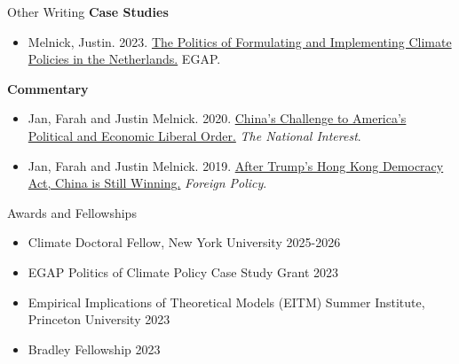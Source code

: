 \documentclass{resume} %
\begin{document}
\newpage
\begin{rSection}{Other Writing}
\textbf{Case Studies}
\begin{itemize}
\item Melnick, Justin. 2023. \href{https://justinmelnick.github.io/papers/ets/case.pdf}{The Politics of Formulating and Implementing Climate Policies in the Netherlands.} EGAP.
\end{itemize}

\smallskip

\textbf{Commentary}
    \begin{itemize}
    \item   Jan, Farah and Justin Melnick. 2020. \href{https://nationalinterest.org/feature/chinas-challenge-america\%E2\%80\%99s-political-and-economic-liberal-order-111361}{China's Challenge to America's Political and Economic Liberal Order.} \textit{The National Interest}.
    \item    Jan, Farah and Justin Melnick. 2019. \href{https://foreignpolicy.com/2019/12/02/trump-surprise-move-human-rights-hong-kong-protesters-democracy-act-upper-hand-china-trade-talks/}{After Trump's Hong Kong Democracy Act, China is Still Winning.} \textit{Foreign Policy}.
\end{itemize}
\end{rSection}

\begin{rSection}{Awards and Fellowships}
\begin{itemize}
\item Climate Doctoral Fellow, New York University \hfill 2025-2026
\item EGAP Politics of Climate Policy Case Study Grant \hfill 2023
\item Empirical Implications of Theoretical Models (EITM) Summer Institute, Princeton University \hfill 2023
\item Bradley Fellowship \hfill 2023
\end{itemize}
\end{rSection}
\end{document}
